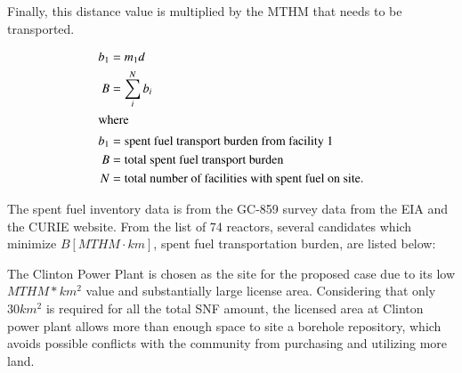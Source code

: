 Finally, this distance value is multiplied by the \gls{MTHM} that needs to be transported.


\begin{align}
        b_1 &= m_1d\\
        B &= \sum_i^N b_i\\
        \intertext{where}
        b_1 &= \mbox{spent fuel transport burden from facility 1}\\
        B &= \mbox{total spent fuel transport burden}\\
        N &= \mbox{total number of facilities with spent fuel on site.}
\end{align}

The spent fuel inventory data is from the GC-859 survey data from the \gls{EIA} 
\cite{eia} and the \gls{CURIE} website.  From the list of 74 reactors, several 
candidates which minimize $B [MTHM\cdot km]$, spent fuel transportation burden, 
are listed below:
    
\begin{table}[h]
\centering

        \caption { Reactors with relatively small spent fuel transportation burden  $B [MTHM\cdot km]$.}
\end {table}


The Clinton Power Plant is chosen as the site for the proposed case due to its
low $MTHM*km^2$ value and substantially large license area\cite{NRC_Clinton}.
 Considering that only
 $30km^2$ is required for all the total \gls{SNF} amount, the licensed area at Clinton
  power plant allows more than  enough space to site a borehole repository, which
   avoids possible conflicts with the community from purchasing and utilizing more
    land. 
  
